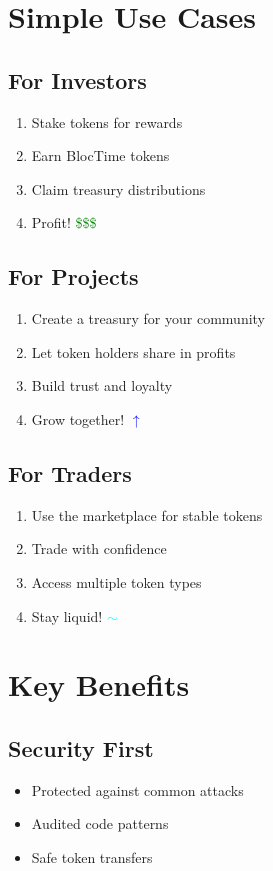 \documentclass[11pt,a4paper]{article}
\begin{document}
\section{Simple Use Cases}

\subsection{For Investors}
\begin{enumerate}
\item Stake tokens for rewards
\item Earn BlocTime tokens
\item Claim treasury distributions
\item Profit! \textcolor{green}{\$\$\$}
\end{enumerate}

\subsection{For Projects}
\begin{enumerate}
\item Create a treasury for your community
\item Let token holders share in profits
\item Build trust and loyalty
\item Grow together! \textcolor{blue}{$\uparrow$}
\end{enumerate}

\subsection{For Traders}
\begin{enumerate}
\item Use the marketplace for stable tokens
\item Trade with confidence
\item Access multiple token types
\item Stay liquid! \textcolor{cyan}{$\sim$}
\end{enumerate}

\section{Key Benefits}

\subsection{Security First}
\begin{itemize}
\item Protected against common attacks
\item Audited code patterns
\item Safe token transfers
\end{itemize}
\end{document}
